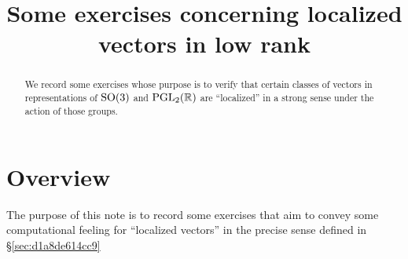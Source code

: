 \documentclass[reqno]{amsart} 
\title{Some exercises concerning localized vectors in low rank}
\numberwithin{equation}{section}
\numberwithin{theorem}{section}
\begin{document}
\maketitle
\tableofcontents


\begin{abstract}
We record some exercises whose purpose is to verify that certain classes of vectors in representations of $\operatorname{SO}(3)$ and $\operatorname{PGL}_2(\mathbb{R})$ are ``localized'' in a strong sense under the action of those groups.  
\end{abstract}

\section{Overview}\label{sec:d1a9162ede03}

The purpose of this note is to record some exercises that aim to convey some computational feeling for ``localized vectors'' in the precise sense defined in \S\ref{sec:d1a8de614cc9} 





{} 
\end{document}
